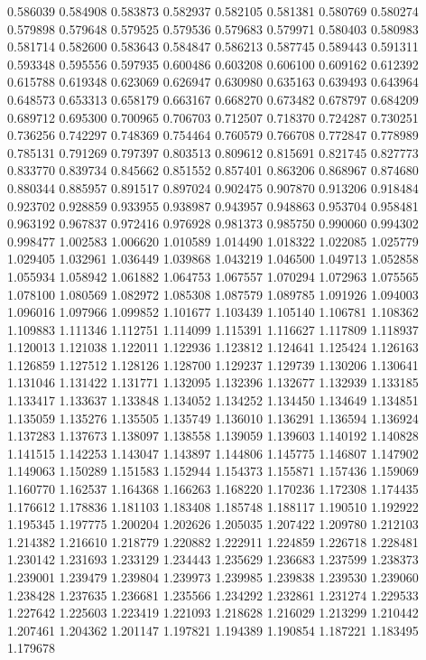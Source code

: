 0.586039
0.584908
0.583873
0.582937
0.582105
0.581381
0.580769
0.580274
0.579898
0.579648
0.579525
0.579536
0.579683
0.579971
0.580403
0.580983
0.581714
0.582600
0.583643
0.584847
0.586213
0.587745
0.589443
0.591311
0.593348
0.595556
0.597935
0.600486
0.603208
0.606100
0.609162
0.612392
0.615788
0.619348
0.623069
0.626947
0.630980
0.635163
0.639493
0.643964
0.648573
0.653313
0.658179
0.663167
0.668270
0.673482
0.678797
0.684209
0.689712
0.695300
0.700965
0.706703
0.712507
0.718370
0.724287
0.730251
0.736256
0.742297
0.748369
0.754464
0.760579
0.766708
0.772847
0.778989
0.785131
0.791269
0.797397
0.803513
0.809612
0.815691
0.821745
0.827773
0.833770
0.839734
0.845662
0.851552
0.857401
0.863206
0.868967
0.874680
0.880344
0.885957
0.891517
0.897024
0.902475
0.907870
0.913206
0.918484
0.923702
0.928859
0.933955
0.938987
0.943957
0.948863
0.953704
0.958481
0.963192
0.967837
0.972416
0.976928
0.981373
0.985750
0.990060
0.994302
0.998477
1.002583
1.006620
1.010589
1.014490
1.018322
1.022085
1.025779
1.029405
1.032961
1.036449
1.039868
1.043219
1.046500
1.049713
1.052858
1.055934
1.058942
1.061882
1.064753
1.067557
1.070294
1.072963
1.075565
1.078100
1.080569
1.082972
1.085308
1.087579
1.089785
1.091926
1.094003
1.096016
1.097966
1.099852
1.101677
1.103439
1.105140
1.106781
1.108362
1.109883
1.111346
1.112751
1.114099
1.115391
1.116627
1.117809
1.118937
1.120013
1.121038
1.122011
1.122936
1.123812
1.124641
1.125424
1.126163
1.126859
1.127512
1.128126
1.128700
1.129237
1.129739
1.130206
1.130641
1.131046
1.131422
1.131771
1.132095
1.132396
1.132677
1.132939
1.133185
1.133417
1.133637
1.133848
1.134052
1.134252
1.134450
1.134649
1.134851
1.135059
1.135276
1.135505
1.135749
1.136010
1.136291
1.136594
1.136924
1.137283
1.137673
1.138097
1.138558
1.139059
1.139603
1.140192
1.140828
1.141515
1.142253
1.143047
1.143897
1.144806
1.145775
1.146807
1.147902
1.149063
1.150289
1.151583
1.152944
1.154373
1.155871
1.157436
1.159069
1.160770
1.162537
1.164368
1.166263
1.168220
1.170236
1.172308
1.174435
1.176612
1.178836
1.181103
1.183408
1.185748
1.188117
1.190510
1.192922
1.195345
1.197775
1.200204
1.202626
1.205035
1.207422
1.209780
1.212103
1.214382
1.216610
1.218779
1.220882
1.222911
1.224859
1.226718
1.228481
1.230142
1.231693
1.233129
1.234443
1.235629
1.236683
1.237599
1.238373
1.239001
1.239479
1.239804
1.239973
1.239985
1.239838
1.239530
1.239060
1.238428
1.237635
1.236681
1.235566
1.234292
1.232861
1.231274
1.229533
1.227642
1.225603
1.223419
1.221093
1.218628
1.216029
1.213299
1.210442
1.207461
1.204362
1.201147
1.197821
1.194389
1.190854
1.187221
1.183495
1.179678
